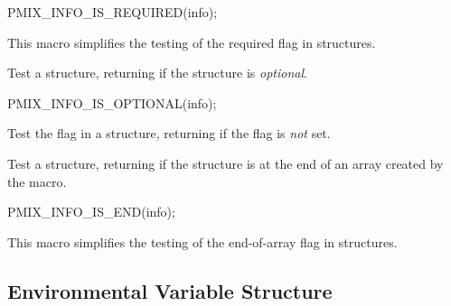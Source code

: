 \cspecificstart
\begin{codepar}
PMIX_INFO_IS_REQUIRED(info);
\end{codepar}
\cspecificend

\begin{arglist}
\end{arglist}

This macro simplifies the testing of the required flag in  structures.


Test a  structure, returning  if the structure is \textit{optional}.

\cspecificstart
\begin{codepar}
PMIX_INFO_IS_OPTIONAL(info);
\end{codepar}
\cspecificend

\begin{arglist}
\end{arglist}

Test the  flag in a  structure, returning  if the flag is \textit{not} set.


Test a  structure, returning  if the structure is at the end of an array created by the  macro.

\cspecificstart
\begin{codepar}
PMIX_INFO_IS_END(info);
\end{codepar}
\cspecificend

\begin{arglist}
\end{arglist}

This macro simplifies the testing of the end-of-array flag in  structures.

\subsection{Environmental Variable Structure}

